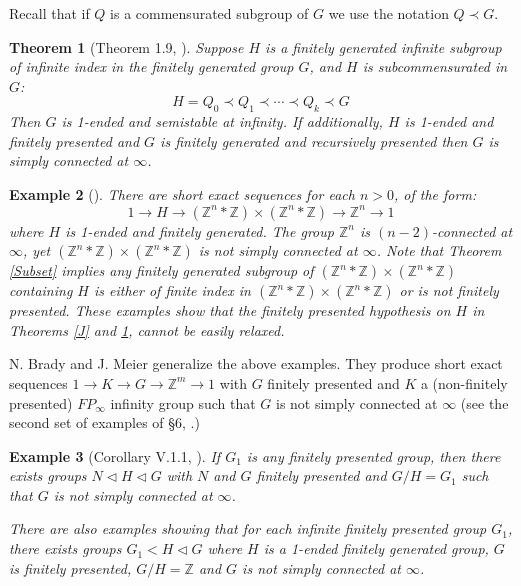 \documentclass[12pt]{article}
\newtheorem{theorem}{Theorem}[subsection]
\newtheorem{example}[theorem]{Example}
\begin{document}
\noindent Recall that if $Q$ is a commensurated subgroup of $G$ we use the notation $Q\prec G$.

\begin{theorem} [Theorem 1.9, \cite{M6}]  \label{MainA}  Suppose $H$ is a finitely generated infinite subgroup of infinite index in the finitely generated group $G$, and  $H$ is subcommensurated in $G$:
$$H=Q_0\prec Q_1\prec \cdots \prec Q_{k}\prec G$$
Then $G$ is 1-ended and semistable at infinity. If additionally, $H$ is 1-ended and finitely presented and $G$ is finitely generated and recursively presented then $G$ is simply connected at $\infty$.
\end{theorem} 


\begin{example} [\cite{M96}]
There are short exact sequences for each $n>0$, of the form:
$$ 1\to H\to (\mathbb Z^n\ast \mathbb Z)\times (\mathbb Z^n\ast \mathbb Z)\to\mathbb Z^n\to 1$$
where $H$ is 1-ended and finitely generated. The group $\mathbb Z^n$ is $(n-2)$-connected at $\infty$, yet $(\mathbb Z^n\ast \mathbb Z)\times (\mathbb Z^n\ast \mathbb Z)$ is not simply connected at $\infty$. 
Note that Theorem \ref{Subset} implies any finitely generated subgroup of $(\mathbb Z^n\ast \mathbb Z)\times (\mathbb Z^n\ast \mathbb Z)$ containing $H$ is either of finite index in $(\mathbb Z^n\ast \mathbb Z)\times (\mathbb Z^n\ast \mathbb Z)$ or is not finitely presented. These examples show that the finitely presented hypothesis on $H$ in Theorems \ref{J} and \ref{MainA}, cannot be easily relaxed.
\end{example}

N. Brady and J. Meier  generalize the above examples.  They produce short exact sequences $1\to K\to G\to \mathbb Z^m\to 1$ with $G$ finitely presented  and $K$  a (non-finitely presented) $FP_\infty$ infinity group  such that $G$ is not simply connected at $\infty$ (see the second set of examples of \S 6, \cite{BrM01}.) 

\begin{example} [Corollary V.1.1, \cite{P90}] \label{Pro1}  If $G_1$ is any finitely presented group, then there exists groups $N\lhd H\lhd G$ with $N$ and $G$ finitely presented and $G/H=G_1$ such that $G$ is not simply connected at $\infty$. 

There are also examples showing that for each infinite finitely presented group $G_1$, there exists groups $G_1<H\lhd G$ where $H$ is a 1-ended finitely generated group, $G$ is finitely presented, $G/H=\mathbb Z$ and $G$ is not simply connected at $\infty$.
\end{example}  
\end{document}
